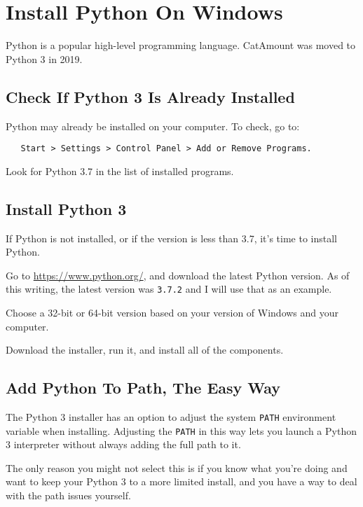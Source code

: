 \chapter{Install Python On Windows}
\hypertarget{windows-install-python}{}

Python is a popular high-level programming language. CatAmount was
moved to Python 3 in 2019.

\section{Check If Python 3 Is Already Installed}

Python may already be installed on your computer. To check, go
to:

\begin{verbatim}
   Start > Settings > Control Panel > Add or Remove Programs.
\end{verbatim}

Look for Python 3.7 in the list of installed programs.

\section{Install Python 3}

If Python is not installed, or if the version is less than 3.7,
it's time to install Python.

Go to \url{https://www.python.org/}, and download the latest
Python version. As of this writing, the latest version was \texttt{3.7.2}
and I will use that as an example.

Choose a 32-bit or 64-bit version based on your version of Windows
and your computer.

Download the installer, run it, and install all of the components.


\section{Add Python To Path, The Easy Way}

The Python 3 installer has an option to adjust the system \texttt{PATH}
environment variable when installing. Adjusting the \texttt{PATH} in this
way lets you launch a Python 3 interpreter without always adding
the full path to it.

The only reason you might not select this is if you know what
you're doing and want to keep your Python 3 to a more limited install,
and you have a way to deal with the path issues yourself.


